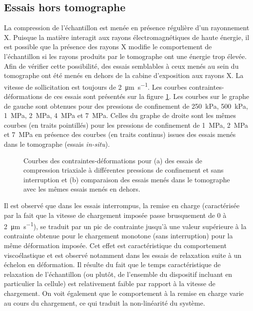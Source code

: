 	\subsection{Essais hors tomographe}
		La compression de l'échantillon est menée en présence régulière d'un rayonnement X. Puisque la matière interagit aux rayons électromagnétiques de haute énergie, il est possible que la présence des rayons X modifie le comportement de l'échantillon si les rayons produits par le tomographe ont une énergie trop élevée. Afin de vérifier cette possibilité, des essais semblables à ceux menés au sein du tomographe ont été menés en dehors de la cabine d'exposition aux rayons X. La vitesse de sollicitation est toujours de \SI[per-mode=symbol]{2}{\micro\meter\per\second}. Les courbes contraintes-déformations de ces essais sont présentés sur la figure \ref{fig04:courbes_in_out}. Les courbes sur le graphe de gauche sont obtenues pour des pressions de confinement de \SI{250}{\kilo\pascal}, \SI{500}{\kilo\pascal}, \SI{1}{\mega\pascal}, \SI{2}{\mega\pascal}, \SI{4}{\mega\pascal} et \SI{7}{\mega\pascal}. Celles du graphe de droite sont les mêmes courbes (en traits pointillés) pour les pressions de confinement de \SI{1}{\mega\pascal}, \SI{2}{\mega\pascal} et \SI{7}{\mega\pascal} en présence des courbes (en traits continus) issues des essais menés dans le tomographe (essais \textit{in-situ}).
		\begin{figure}\centering
			\hfill
			\caption{\label{fig04:courbes_in_out}Courbes des contraintes-déformations pour (a) des essais de compression triaxiale à différentes pressions de confinement et sans interruption et (b) comparaison des essais menés dans le tomographe avec les mêmes essais menés en dehors.}
		\end{figure}
		Il est observé que dans les essais interrompus, la remise en charge (caractérisée par la fait que la vitesse de chargement imposée passe brusquement de \num{0} à \SI[per-mode=symbol]{2}{\micro\meter\per\second}), se traduit par un pic de contrainte jusqu'à une valeur supérieure à la contrainte obtenue pour le chargement monotone (sans interruption) pour la même déformation imposée. Cet effet est caractéristique du comportement viscoélastique et est observé notamment dans les essais de relaxation suite à un échelon en déformation. Il résulte du fait que le temps caractéristique de relaxation de l'échantillon (ou plutôt, de l'ensemble du dispositif incluant en particulier la cellule) est relativement faible par rapport à la vitesse de chargement. On voit également que le comportement à la remise en charge varie au cours du chargement, ce qui traduit la non-linéarité du système.
